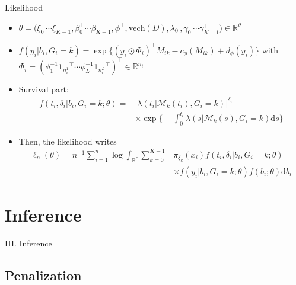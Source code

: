 \documentclass{beamer}
\newcommand{\dd}{\mathrm{d}}
\newcommand{\R}{\mathbb R}
\newcommand{\cM}{\mathcal M}
\begin{document}
\begin{frame}{Likelihood}

\footnotesize
\begin{itemize}
  \item \scriptsize $\theta = \big(\xi_0^\top \cdots \xi_{K-1}^\top, \beta_0^\top \cdots \beta_{K-1}^\top, \phi^\top, \text{vech}(D), \lambda_0^\top, \gamma_0^\top \cdots \gamma_{K-1}^\top\big) \in \R^\vartheta$
  \item $f(y_i|b_i, G_i=k) = \exp \big\{(y_i \odot \Phi_i)^\top M_{ik} - c_\phi(M_{ik}) + d_\phi(y_i) \big\}$ with $\Phi_i = (\phi_1^{-1} {\textbf{1}_{n_i^1}}^\top \cdots \phi_L^{-1} {\textbf{1}_{n_i^L}}^\top)^\top \in \R^{n_i}$
  \item Survival part:
  \begin{align*}f(t_i, \delta_i| b_i, G_i = k ; \theta) = &\big[\lambda(t_i|\cM_k(t_i), G_i = k)\big]^{\delta_i} \\ & \times \exp \Big\{-\int_0^{t_i} \lambda(s|\cM_k(s), G_i = k) \dd s \Big\}
  \end{align*}
  \item Then, the likelihood writes
  \begin{align*}\ell_n(\theta) = n^{-1} \sum_{i=1}^n \log \int_{\R^r} \sum_{k=0}^{K-1} &\pi_{\xi_k}(x_i) f(t_i, \delta_i| b_i, G_i = k ; \theta) \\ & \times f(y_i | b_i, G_i = k ; \theta) f(b_i ; \theta) \dd b_i
  \end{align*}
\end{itemize}

\end{frame}

\section{Inference}

\begin{frame}[noframenumbering]
\Large \centering
\textcolor{blue_pres}{III.} Inference
\end{frame}

\subsection{Penalization}
\end{document}
